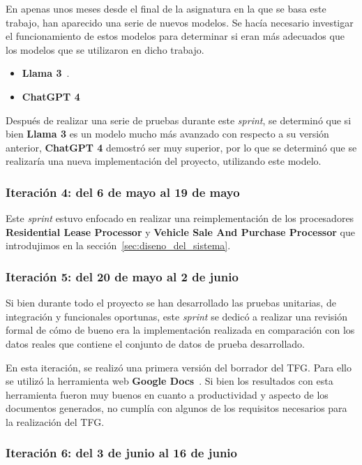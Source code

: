 En apenas unos meses desde el final de la asignatura en la que se basa este trabajo, han aparecido una serie de nuevos
modelos.
Se hacía necesario investigar el funcionamiento de estos modelos para determinar si eran más adecuados que los modelos
que se utilizaron en dicho trabajo.

\begin{itemize}
    \item \textbf{Llama 3}~\cite{url_llama3}.
    \item \textbf{ChatGPT 4}~\cite{url_gpt4}
\end{itemize}

Después de realizar una serie de pruebas durante este \textit{sprint}, se determinó que si bien \textbf{Llama 3} es un
modelo mucho más avanzado con respecto a su versión anterior, \textbf{ChatGPT 4} demostró ser muy superior, por lo que
se determinó que se realizaría una nueva implementación del proyecto, utilizando este modelo.

\subsubsection{Iteración 4: del 6 de mayo al 19 de mayo}

Este \textit{sprint} estuvo enfocado en realizar una reimplementación de los procesadores
\textbf{Residential Lease Processor} y \textbf{Vehicle Sale And Purchase Processor} que introdujimos en la
sección~\ref{sec:diseno_del_sistema}.

\subsubsection{Iteración 5: del 20 de mayo al 2 de junio}

Si bien durante todo el proyecto se han desarrollado las pruebas unitarias, de integración y funcionales oportunas, este
\textit{sprint} se dedicó a realizar una revisión formal de cómo de bueno era la implementación realizada en comparación
con los datos reales que contiene el conjunto de datos de prueba desarrollado.

En esta iteración, se realizó una primera versión del borrador del TFG. Para ello se utilizó la herramienta web
\textbf{Google Docs}~\cite{url_google_docs}.
Si bien los resultados con esta herramienta fueron muy buenos en cuanto a productividad y aspecto de los documentos
generados, no cumplía con algunos de los requisitos necesarios para la realización del TFG.

\subsubsection{Iteración 6: del 3 de junio al 16 de junio}

